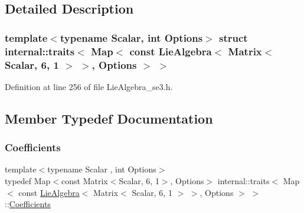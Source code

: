 \subsection{Detailed Description}
\subsubsection*{template$<$typename Scalar, int Options$>$\newline
struct internal\+::traits$<$ Map$<$ const Lie\+Algebra$<$ Matrix$<$ Scalar, 6, 1 $>$ $>$, Options $>$ $>$}



Definition at line 256 of file Lie\+Algebra\+\_\+se3.\+h.



\subsection{Member Typedef Documentation}
\hypertarget{structinternal_1_1traits_3_01_map_3_01const_01_lie_algebra_3_01_matrix_3_01_scalar_00_016_00_011bdc50eba447989365acf4f3cfd5e5212_a9f0719d8c0161f53a3026c0d98dffa53}{}\label{structinternal_1_1traits_3_01_map_3_01const_01_lie_algebra_3_01_matrix_3_01_scalar_00_016_00_011bdc50eba447989365acf4f3cfd5e5212_a9f0719d8c0161f53a3026c0d98dffa53} 
\subsubsection{\texorpdfstring{Coefficients}{Coefficients}}
{\footnotesize\ttfamily template$<$typename Scalar , int Options$>$ \\
typedef Map$<$const Matrix$<$Scalar, 6, 1$>$, Options$>$ internal\+::traits$<$ Map$<$ const \hyperlink{class_lie_algebra}{Lie\+Algebra}$<$ Matrix$<$ Scalar, 6, 1 $>$ $>$, Options $>$ $>$\+::\hyperlink{structinternal_1_1traits_3_01_map_3_01const_01_lie_algebra_3_01_matrix_3_01_scalar_00_016_00_011bdc50eba447989365acf4f3cfd5e5212_a9f0719d8c0161f53a3026c0d98dffa53}{Coefficients}}



